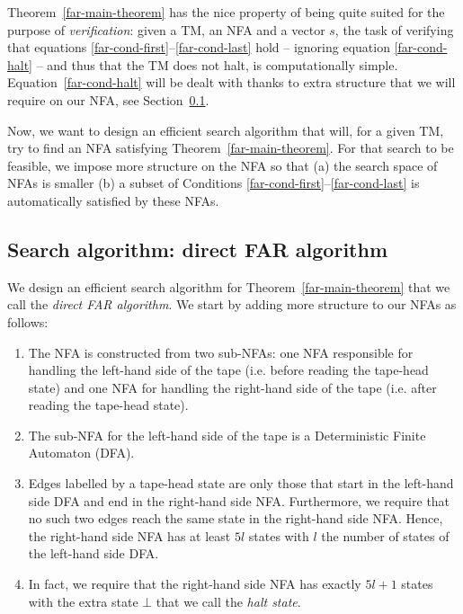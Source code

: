 \begin{remark}[Verification]\normalfont\label{far-remark-verification}
  Theorem~\ref{far-main-theorem} has the nice property of being quite suited for the purpose of \textit{verification}: given a TM, an NFA and a vector $s$, the task of verifying that equations \eqref{far-cond-first}--\eqref{far-cond-last} hold -- ignoring equation \eqref{far-cond-halt} -- and thus that the TM does not halt, is computationally simple. Equation~\eqref{far-cond-halt} will be dealt with thanks to extra structure that we will require on our NFA, see Section~\ref{far-algo-direct}.
\end{remark}


Now, we want to design an efficient search algorithm that will, for a given TM, try to find an NFA satisfying Theorem~\ref{far-main-theorem}. For that search to be feasible, we impose more structure on the NFA so that (a) the search space of NFAs is smaller (b) a subset of Conditions \eqref{far-cond-first}--\eqref{far-cond-last} is automatically satisfied by these NFAs.


\subsection{Search algorithm: direct FAR algorithm}
\label{far-algo-direct}

We design an efficient search algorithm for Theorem~\ref{far-main-theorem} that we call the \textit{direct FAR algorithm}. We start by adding more structure to our NFAs as follows:


\begin{enumerate}

  \item The NFA is constructed from two sub-NFAs: one NFA responsible for handling the left-hand side of the tape (i.e. before reading the tape-head state) and one NFA for handling the right-hand side of the tape (i.e. after reading the tape-head state).
  \item The sub-NFA for the left-hand side of the tape is a Deterministic Finite Automaton (DFA).
  \item Edges labelled by a tape-head state are only those that start in the left-hand side DFA and end in the right-hand side NFA. Furthermore, we require that no such two edges reach the same state in the right-hand side NFA. Hence, the right-hand side NFA has at least $5l$ states with $l$ the number of states of the left-hand side DFA.\label{pt:injective}
  \item In fact, we require that the right-hand side NFA has exactly $5l+1$ states with the extra state $\bot$ that we call the \textit{halt state}.

\end{enumerate}

